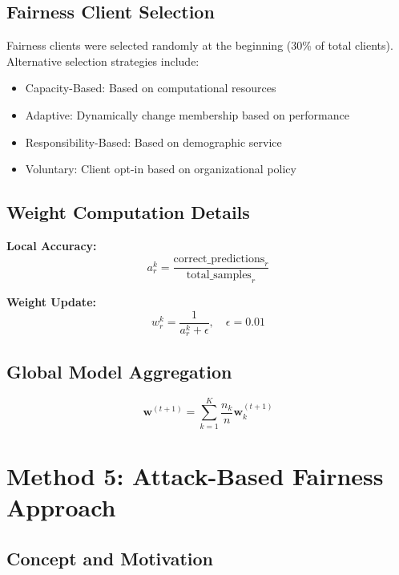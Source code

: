 \documentclass[11pt,a4paper]{report}
\begin{document}
\subsection{Fairness Client Selection}

Fairness clients were selected randomly at the beginning (30\% of total clients). Alternative selection strategies include:

\begin{itemize}
    \item Capacity-Based: Based on computational resources
    \item Adaptive: Dynamically change membership based on performance
    \item Responsibility-Based: Based on demographic service
    \item Voluntary: Client opt-in based on organizational policy
\end{itemize}

\subsection{Weight Computation Details}

\textbf{Local Accuracy:}
\begin{equation}
a_r^k = \frac{\text{correct\_predictions}_r}{\text{total\_samples}_r}
\end{equation}

\textbf{Weight Update:}
\begin{equation}
w_r^k = \frac{1}{a_r^k + \epsilon}, \quad \epsilon = 0.01
\end{equation}

\subsection{Global Model Aggregation}

\begin{equation}
\mathbf{w}^{(t+1)} = \sum_{k=1}^{K} \frac{n_k}{n} \mathbf{w}_k^{(t+1)}
\end{equation}

\section{Method 5: Attack-Based Fairness Approach}

\subsection{Concept and Motivation}
\end{document}
